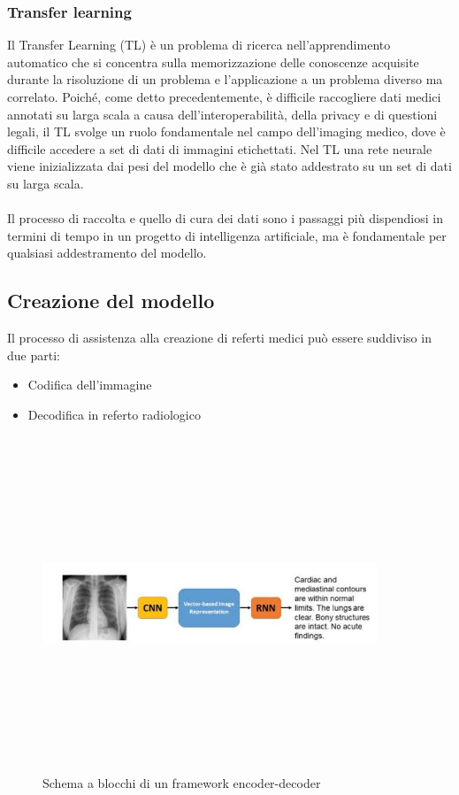\documentclass[12pt,a4paper]{report}
\begin{document}
\subsubsection{Transfer learning}
Il Transfer Learning (TL) \cite{singh2019chest} è un problema di ricerca nell'apprendimento automatico che si concentra sulla memorizzazione delle conoscenze acquisite durante la risoluzione di un problema e l'applicazione a un problema diverso ma correlato.
Poiché, come detto precedentemente, è difficile raccogliere dati medici annotati su larga scala a causa dell'interoperabilità, della privacy e di questioni legali, il TL svolge un ruolo fondamentale nel campo dell'imaging medico, dove è difficile accedere a set di dati di immagini etichettati. Nel TL una rete neurale viene inizializzata dai pesi del modello che è già stato addestrato su un set di dati su larga scala.\\
\\
Il processo di raccolta e quello di cura dei dati sono i passaggi più dispendiosi in termini di tempo in un progetto di intelligenza artificiale, ma è fondamentale per qualsiasi addestramento del modello.

\subsection{Creazione del modello}
Il processo di assistenza alla creazione di referti medici può essere suddiviso in due parti:
\begin{itemize}
    \item Codifica dell’immagine
    \item Decodifica in referto radiologico
\end{itemize}

\begin{figure}[h!]
    \begin{center}
        \includegraphics[width=10cm,height=10cm,keepaspectratio]{Encoder-Decoder}
    \end{center}
    \caption{Schema a blocchi di un framework encoder-decoder}
    \label{fig:econder-decoder}
\end{figure}
\end{document}
